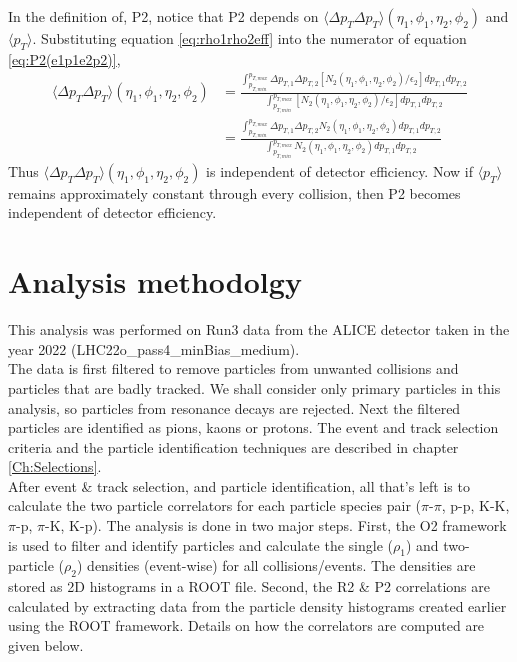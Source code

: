 \documentclass[12pt,a4paper,twoside]{report}
\begin{document}
In the definition of, P2, notice that P2 depends on $\langle\Delta p_T \Delta p_T\rangle(\eta_1,\phi_1,\eta_2,\phi_2)$ and $\langle p_T\rangle$. 
Substituting equation \ref{eq:rho1rho2eff} into the numerator of equation \ref{eq:P2(e1p1e2p2)},
\begin{align}\nonumber
	\langle\Delta p_T \Delta p_T\rangle(\eta_1,\phi_1,\eta_2,\phi_2)&=\frac{\int_{p_{T,min}}^{p_{T,max}}\Delta p_{T,1}\Delta p_{T,2}[N_2(\eta_1,\phi_1,\eta_2,\phi_2)/\epsilon_2]d p_{T,1}d p_{T,2}}{\int_{p_{T,min}}^{p_{T,max}}[N_2(\eta_1,\phi_1,\eta_2,\phi_2)/\epsilon_2]d p_{T,1}d p_{T,2}}\\&=\frac{\int_{p_{T,min}}^{p_{T,max}}\Delta p_{T,1}\Delta p_{T,2}N_2(\eta_1,\phi_1,\eta_2,\phi_2)d p_{T,1}d p_{T,2}}{\int_{p_{T,min}}^{p_{T,max}}N_2(\eta_1,\phi_1,\eta_2,\phi_2)d p_{T,1}d p_{T,2}}
\end{align}
Thus $\langle\Delta p_T \Delta p_T\rangle(\eta_1,\phi_1,\eta_2,\phi_2)$ is independent of detector efficiency. Now if $\langle p_T\rangle$ remains approximately constant through every collision, then P2 becomes independent of detector efficiency.

\chapter{Analysis methodolgy}\label{Ch:Methodology}
This analysis was performed on Run3 data from the ALICE detector taken in the year 2022 (LHC22o\_pass4\_minBias\_medium).\\ 
The data is first filtered to remove particles from unwanted collisions and particles that are badly tracked. We shall consider only primary particles in this analysis, so particles from resonance decays are rejected. Next the filtered particles are identified as pions, kaons or protons. The event and track selection criteria and the particle identification techniques are described in chapter \ref{Ch:Selections}.\\
After event \& track selection, and particle identification, all that's left is to calculate the two particle correlators for each particle species pair ($\pi$-$\pi$, p-p, K-K, $\pi$-p, $\pi$-K, K-p). The analysis is done in two major steps. First, the O2 framework is used to filter and identify particles and calculate the single ($\rho_1$) and two-particle ($\rho_2$) densities (event-wise) for all collisions/events. The densities are stored as 2D histograms in a ROOT file. Second, the R2 \& P2 correlations are calculated by extracting data from the particle density histograms created earlier using the ROOT framework. Details on how the correlators are computed are given below.\\
 
\end{document}
